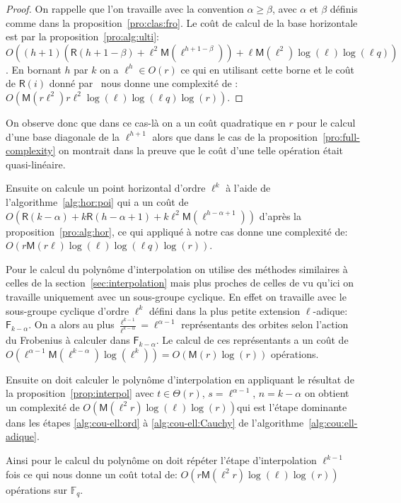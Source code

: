 \documentclass[10pt,a4paper]{book}
\theoremstyle{plain}
\theoremstyle{definition}
\theoremstyle{definition}
\theoremstyle{definition}
\theoremstyle{definition}
\theoremstyle{remark}
\theoremstyle{remark}
\theoremstyle{definition}
\begin{document}
\begin{proof}
On rappelle que l'on travaille avec la convention $\alpha \geqslant \beta$, 
avec $\alpha$ et $\beta$ définis comme dans la proposition~\ref{pro:clas:fro}.
Le coût de calcul de la base horizontale est par la proposition~\ref{pro:alg:ulti}:
$O((h+1)(\mathsf{R}(h+1-\beta)+\ell^2 \mathsf{M}(\ell^{h+1-\beta}))+\ell \mathsf{M}(\ell^2)\log(\ell)\log(\ell q))$. 
En bornant $h$ par $k$ on a $\ell^h \in O(r)$ ce qui en utilisant cette
borne et le coût de $\mathsf{R}(i)$ donné par~\cite[chapter 14.5]{vzGJG03} nous 
donne une complexité de :
$O(\mathsf{M}(r\ell^2)r\ell^2\log(\ell)\log(\ell q) \log(r))$.
\end{proof}
On observe donc que dans ce cas-là on a un coût quadratique en $r$ pour le 
calcul d'une base diagonale de la $\ell^{h+1}$ alors que dans le cas de la 
proposition~\ref{pro:full-complexity} on montrait dans la preuve que le coût 
d'une telle opération était quasi-linéaire.

Ensuite on calcule un point horizontal d'ordre $\ell^k$ à l'aide de 
l'algorithme~\ref{alg:hor:poi} qui a un coût de 
$O(\mathsf{R}(k-\alpha) + k\mathsf{R}(h-\alpha+1) + k\ell^2\mathsf{M}(\ell^{h-\alpha+1}))$
d'après la proposition~\ref{pro:alg:hor}, ce qui appliqué à notre cas donne 
une complexité de: $O(r \mathsf{M}(r \ell)\log(\ell)\log(\ell q) \log(r))$.

Pour le calcul du polynôme d'interpolation on utilise des méthodes 
similaires à celles de la section~\ref{sec:interpolation} mais plus proches de 
celles de \cite[§5]{DeFeo11} vu qu'ici on travaille uniquement avec un sous-groupe 
cyclique. En effet on travaille avec le sous-groupe cyclique d'ordre $\ell^k$ 
défini dans la plus petite extension $\ell$-adique: $\mathsf{F}_{k-\alpha}$. 
On a alors au plus $\frac{\ell^{k-1}}{\ell^{k-\alpha}}=\ell^{\alpha-1}$ représentants 
des orbites selon l'action du Frobenius à calculer dans $\mathsf{F}_{k-\alpha}$.
Le calcul de ces représentants a un coût de 
$O(\ell^{\alpha-1}\mathsf{M}(\ell^{k-\alpha})\log(\ell^k))=O(\mathsf{M}(r)\log(r))$ opérations.

Ensuite on doit calculer le polynôme d'interpolation en appliquant le résultat
 de la proposition~\ref{prop:interpol} avec $t \in \Theta(r)$, $s=\ell^{\alpha-1}$, 
 $n=k-\alpha$ on obtient un complexité de 
 $O(\mathsf{M}(\ell^2r)\log(\ell)\log(r))$qui est l'étape dominante dans les
 étapes \ref{alg:cou-ell:ord} à \ref{alg:cou-ell:Cauchy} de 
 l'algorithme~\ref{alg:cou:ell-adique}.

Ainsi pour le calcul du polynôme on doit répéter l'étape d'interpolation 
$\ell^{k-1}$ fois ce qui nous donne un coût total de: 
$O(r\mathsf{M}(\ell^2r)\log(\ell)\log(r))$ opérations sur $\mathbb{F}_q$.
\end{document}
